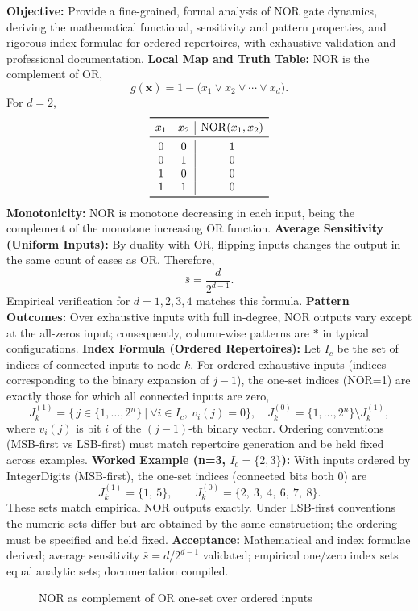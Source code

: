 \textbf{Objective:} Provide a fine-grained, formal analysis of NOR gate dynamics, deriving the mathematical functional, sensitivity and pattern properties, and rigorous index formulae for ordered repertoires, with exhaustive validation and professional documentation.
\textbf{Local Map and Truth Table:} NOR is the complement of OR,
\[
g(\mathbf{x}) = 1 - \big( x_1 \lor x_2 \lor \cdots \lor x_d \big).
\]
For \(d=2\),
\[
\begin{array}{cc|c}
\toprule
 x_1 & x_2 & \mathrm{NOR}(x_1,x_2) \\
\midrule
 0 & 0 & 1 \\
 0 & 1 & 0 \\
 1 & 0 & 0 \\
 1 & 1 & 0 \\
\bottomrule
\end{array}
\]
\textbf{Monotonicity:} NOR is monotone decreasing in each input, being the complement of the monotone increasing OR function.
\textbf{Average Sensitivity (Uniform Inputs):} By duality with OR, flipping inputs changes the output in the same count of cases as OR. Therefore,
\[
\bar{s} = \frac{d}{2^{d-1}}.
\]
Empirical verification for \(d=1,2,3,4\) matches this formula.
\textbf{Pattern Outcomes:} Over exhaustive inputs with full in-degree, NOR outputs vary except at the all-zeros input; consequently, column-wise patterns are \(*\) in typical configurations.
\textbf{Index Formula (Ordered Repertoires):} Let \(I_c\) be the set of indices of connected inputs to node \(k\). For ordered exhaustive inputs (indices corresponding to the binary expansion of \(j-1\)), the one-set indices (NOR=1) are exactly those for which all connected inputs are zero,
\[
J_k^{(1)} = \big\{\, j \in \{1,\dots,2^n\} \ \big|\ \forall i \in I_c,\ v_i(j) = 0 \big\},\quad J_k^{(0)} = \{1,\dots,2^n\} \setminus J_k^{(1)},
\]
where \(v_i(j)\) is bit \(i\) of the \((j-1)\)-th binary vector. Ordering conventions (MSB-first vs LSB-first) must match repertoire generation and be held fixed across examples.
\textbf{Worked Example (n=3, \(I_c=\{2,3\}\)):} With inputs ordered by IntegerDigits (MSB-first), the one-set indices (connected bits both 0) are
\[
J_k^{(1)} = \{1,\ 5\},\qquad J_k^{(0)} = \{2,\ 3,\ 4,\ 6,\ 7,\ 8\}.
\]
These sets match empirical NOR outputs exactly. Under LSB-first conventions the numeric sets differ but are obtained by the same construction; the ordering must be specified and held fixed.
\textbf{Acceptance:} Mathematical and index formulae derived; average sensitivity \(\bar{s}=d/2^{d-1}\) validated; empirical one/zero index sets equal analytic sets; documentation compiled.
\begin{figure}[h]
\centering
{}
\caption{NOR as complement of OR one-set over ordered inputs}
\end{figure}


